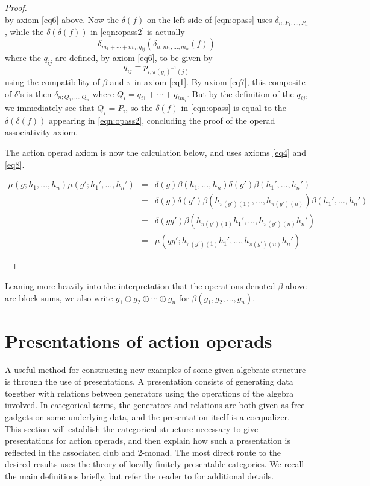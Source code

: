 \documentclass{amsbook} %
\newenvironment{eqn}{\begin{equation}}{\end{equation}}
\numberwithin{section}{chapter}
\begin{document}
\begin{proof}
\begin{eqn}
\end{eqn}by axiom \eqref{eq6} above.  Now the $\delta(f)$ on the left side of \cref{eqn:opass} uses $\delta_{n; P_{1}, \ldots, P_{n}}$, while the $\delta(\delta(f))$ in \cref{eqn:opass2} is actually
\[
\delta_{m_1 + \cdots + m_{n}; q_{ij}}(\delta_{n; m_{1}, \ldots, m_{n}} (f))
\]
where the $q_{ij}$ are defined, by axiom \eqref{eq6}, to be given by
\[
q_{ij} = p_{i,\pi(g_{i})^{-1}(j)}
\]
using the compatibility of $\beta$ and $\pi$ in axiom \eqref{eq1}.  By axiom \eqref{eq7}, this composite of $\delta$'s  is then $\delta_{n; Q_{1}, \ldots, Q_{n}}$ where $Q_{i} = q_{i1} + \cdots + q_{im_{i}}$.  But by the definition of the $q_{ij}$, we immediately see that $Q_{i} = P_{i}$, so the $\delta(f)$ in \cref{eqn:opass} is equal to the $\delta(\delta(f))$ appearing in \cref{eqn:opass2}, concluding the proof of the operad associativity axiom.

The action operad axiom is now the calculation below, and uses axioms \eqref{eq4} and \eqref{eq8}.
\begin{small}
\[
\begin{array}{rcl}
\mu(g; h_{1}, \ldots, h_{n})\mu(g'; h_{1}', \ldots, h_{n}') & = & \delta(g) \beta(h_{1}, \ldots, h_{n}) \delta(g') \beta(h_{1}', \ldots, h_{n}') \\
& = & \delta(g) \delta(g') \beta(h_{\pi(g')(1)}, \ldots, h_{\pi(g')(n)})  \beta(h_{1}', \ldots, h_{n}') \\
& = & \delta(gg') \beta(h_{\pi(g')(1)}h_{1}', \ldots, h_{\pi(g')(n)}h_{n}') \\
& = & \mu(gg'; h_{\pi(g')(1)}h_{1}', \ldots, h_{\pi(g')(n)}h_{n}')
\end{array}
\]
\end{small}
\end{proof}

\begin{nota}\label{beta_to_oplus}
Leaning more heavily into the interpretation that the operations denoted $\beta$ above are block sums, we also write $g_1 \oplus g_2 \oplus \cdots \oplus g_n$ for
$\beta(g_1, g_2, \ldots, g_n)$.
\end{nota}

\section{Presentations of action operads}\label{sec:presofacops}
A useful method for constructing new examples of some given algebraic structure is through the use of presentations. A presentation consists of generating data together with relations between generators using the operations of the algebra involved.  In categorical terms, the generators and relations are both given as free gadgets on some underlying data, and the presentation itself is a coequalizer. This section will establish the categorical structure necessary to give presentations for action operads, and then explain how such a presentation is reflected in the associated club and 2-monad. The most direct route to the desired results uses the theory of locally finitely presentable categories. We recall the main definitions briefly, but refer the reader to \cite{ar} for additional details.
\end{document}
